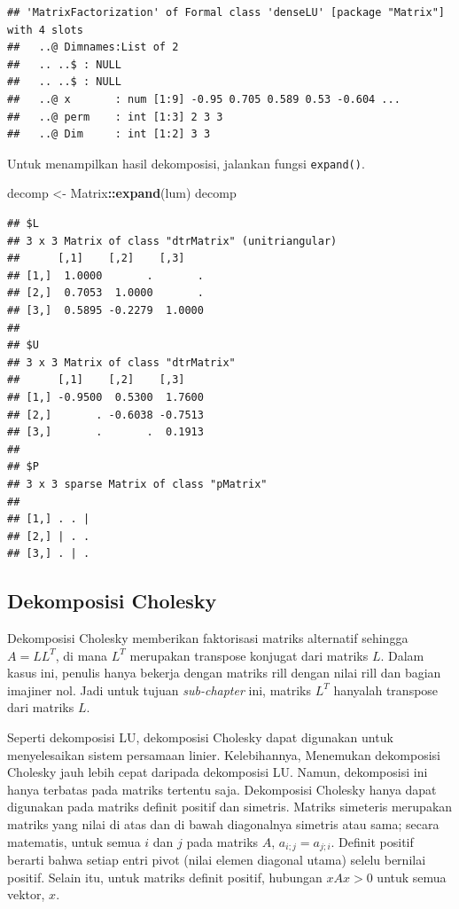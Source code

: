 \documentclass[
]{book}
\newenvironment{Shaded}{\begin{snugshade}}{\end{snugshade}}
\newcommand{\FunctionTok}[1]{\textcolor[rgb]{0.13,0.29,0.53}{\textbf{#1}}}
\newcommand{\NormalTok}[1]{#1}
\newcommand{\OtherTok}[1]{\textcolor[rgb]{0.56,0.35,0.01}{#1}}
\newcommand{\SpecialCharTok}[1]{\textcolor[rgb]{0.81,0.36,0.00}{\textbf{#1}}}
\theoremstyle{definition}
\theoremstyle{definition}
\theoremstyle{definition}
\theoremstyle{definition}
\theoremstyle{remark}
\begin{document}
\begin{verbatim}
## 'MatrixFactorization' of Formal class 'denseLU' [package "Matrix"] with 4 slots
##   ..@ Dimnames:List of 2
##   .. ..$ : NULL
##   .. ..$ : NULL
##   ..@ x       : num [1:9] -0.95 0.705 0.589 0.53 -0.604 ...
##   ..@ perm    : int [1:3] 2 3 3
##   ..@ Dim     : int [1:2] 3 3
\end{verbatim}

Untuk menampilkan hasil dekomposisi, jalankan fungsi \texttt{expand()}.

\begin{Shaded}
\begin{Highlighting}[]
\NormalTok{decomp }\OtherTok{\textless{}{-}}\NormalTok{ Matrix}\SpecialCharTok{::}\FunctionTok{expand}\NormalTok{(lum)}
\NormalTok{decomp}
\end{Highlighting}
\end{Shaded}

\begin{verbatim}
## $L
## 3 x 3 Matrix of class "dtrMatrix" (unitriangular)
##      [,1]    [,2]    [,3]   
## [1,]  1.0000       .       .
## [2,]  0.7053  1.0000       .
## [3,]  0.5895 -0.2279  1.0000
## 
## $U
## 3 x 3 Matrix of class "dtrMatrix"
##      [,1]    [,2]    [,3]   
## [1,] -0.9500  0.5300  1.7600
## [2,]       . -0.6038 -0.7513
## [3,]       .       .  0.1913
## 
## $P
## 3 x 3 sparse Matrix of class "pMatrix"
##           
## [1,] . . |
## [2,] | . .
## [3,] . | .
\end{verbatim}

\hypertarget{dekomposisi-cholesky}{%
\subsection{Dekomposisi Cholesky}\label{dekomposisi-cholesky}}

Dekomposisi Cholesky memberikan faktorisasi matriks alternatif sehingga \(A = LL^T\), di mana \(L^T\) merupakan transpose konjugat dari matriks \(L\). Dalam kasus ini, penulis hanya bekerja dengan matriks rill dengan nilai rill dan bagian imajiner nol. Jadi untuk tujuan \emph{sub-chapter} ini, matriks \(L^T\) hanyalah transpose dari matriks \(L\).

Seperti dekomposisi LU, dekomposisi Cholesky dapat digunakan untuk menyelesaikan sistem persamaan linier. Kelebihannya, Menemukan dekomposisi Cholesky jauh lebih cepat daripada dekomposisi LU. Namun, dekomposisi ini hanya terbatas pada matriks tertentu saja. Dekomposisi Cholesky hanya dapat digunakan pada matriks definit positif dan simetris. Matriks simeteris merupakan matriks yang nilai di atas dan di bawah diagonalnya simetris atau sama; secara matematis, untuk semua \(i\) dan \(j\) pada matriks \(A\), \(a_{i;j}=a_{j;i}\). Definit positif berarti bahwa setiap entri pivot (nilai elemen diagonal utama) selelu bernilai positif. Selain itu, untuk matriks definit positif, hubungan \(xAx>0\) untuk semua vektor, \(x\).
\end{document}
